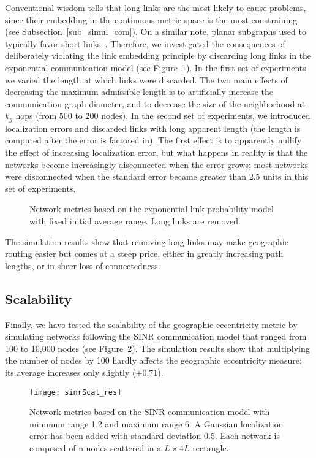 \documentclass{article}
\begin{document}
Conventional wisdom tells that long links are the most likely to cause problems, since their embedding in the continuous metric space is the most constraining (see Subsection~\ref{sub_simul_com}). On a similar note, planar subgraphs used to typically favor short links~\cite{bib_book}. Therefore, we investigated the consequences of deliberately violating the link embedding principle by discarding long links in the exponential communication model (see Figure~\ref{fig_exp_tr}).
In the first set of experiments we varied the length at which links were discarded. The two main effects of decreasing the maximum admissible length is to artificially increase the communication graph diameter, and to decrease the size of the neighborhood at $k_g$ hops (from \~500 to \~200 nodes). In the second set of experiments, we introduced localization errors and discarded links with long apparent length (the length is computed after the error is factored in). The first effect is to apparently nullify the effect of increasing localization error, but what happens in reality is that the networks become increasingly disconnected when the error grows; most networks were disconnected when the standard error became greater than $2.5$ units in this set of experiments.
\begin{figure}[h]
\begin{center}
\caption{Network metrics based on the exponential link probability model with fixed initial average range. Long links are removed.}
\label{fig_exp_tr}
\end{center}
\end{figure}

The simulation results show that removing long links may make geographic routing easier but comes at a steep price, either in greatly increasing path lengths, or in sheer loss of connectedness.

\subsection{Scalability}
Finally, we have tested the scalability of the geographic eccentricity metric by simulating networks following the SINR communication model that ranged from 100 to 10,000 nodes (see Figure~\ref{fig_scal}). The simulation results show that multiplying the number of nodes by 100 hardly affects the geographic eccentricity measure; its average increases only slightly ($+0.71$).
\begin{figure}[h]
\begin{center}
\texttt{[image: sinrScal\_res]}
\caption{Network metrics based on the SINR communication model with minimum range 1.2 and maximum range 6. A Gaussian localization error has been added with standard deviation 0.5. Each network is composed of n nodes
scattered in a $L\times 4L$ rectangle.}
\label{fig_scal}
\end {center}
\end{figure}
\end{document}
